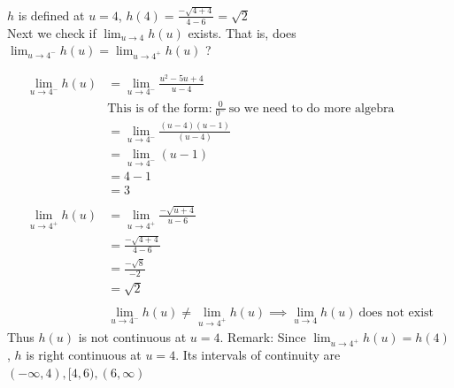 \documentclass[nooutcomes,handout]{ximera}
\begin{document}
\begin{problem}
\begin{enumerate}
\begin{freeResponse}
$h$ is defined at $u=4$, $h(4)=\frac{-\sqrt{4+4}}{4 - 6}=\sqrt{2}$\\
Next we check if  $\lim_{u \to 4} h(u)$ exists.  That is, does $\lim_{u \to 4^-} h(u)=\lim_{u \to 4^+} h(u)$ ?

	\begin{align*}
	\lim_{u \to 4^-} h(u)&=\lim_{u \to 4^-}\frac{u^2-5u+4}{u - 4}\\
	& \text{This is of the form:}\ \frac{0}{0^-}\ \text{so we need to do more algebra}\\
	&=\lim_{u \to 4^-}\frac{(u-4)(u-1)}{(u-4)}\\
	&=\lim_{u \to 4^-}(u-1)\\
	&=4-1\\
	&=3 \\ \\
	\lim_{u \to 4^+} h(u)&=\lim_{u \to 4^+}\frac{-\sqrt{u+4}}{u - 6}\\
	&=\frac{-\sqrt{4+4}}{4 - 6}\\
	&=\frac{-\sqrt{8}}{-2}\\
	&=\sqrt{2}\\ \\
	&\lim_{u \to 4^-} h(u)\ne \lim_{u \to 4^+} h(u) \implies \lim_{u \to 4} h(u)\ \text{does not exist}
	\end{align*}
Thus $h(u)$ is not continuous at $u=4$. Remark: Since $\lim_{u \to 4^+} h(u)=h(4)$, $h$ is right continuous at $u=4$.   Its intervals of continuity are $(-\infty,4),[4,6),(6,\infty)$

	\end{freeResponse}



\end{enumerate}
\end{problem}
								
\end{document}
